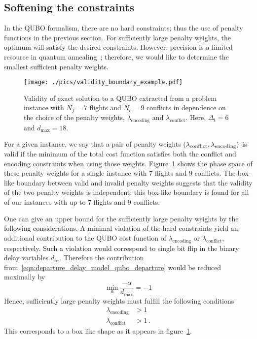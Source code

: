 \subsection{Softening the constraints}
In the QUBO formalism, there are no hard constraints; thus the use of penalty functions in the previous section.
For sufficiently large penalty weights, the optimum will satisfy the desired constraints.
However, precision is a limited resource in quantum annealing~\cite{TODO:D-Wave-precision}; therefore, we would like to determine the smallest sufficient penalty weights.

\begin{figure}[htpb]
\centering
\texttt{[image: ./pics/validity\_boundary\_example.pdf]}
\caption[Penalty weight phase diagram]{Validity of exact solution to a QUBO extracted from a problem instance with $N_f=7$ flights and $N_c=9$ conflicts in dependence on the choice of the penalty weights, $\lambda_\text{encoding}$ and $\lambda_\text{conflict}$. Here, $\Delta_t=6$ and $d_\text{max}=18$.}
\label{fig:penalty_weights}
\end{figure}

For a given instance, we say that a pair of penalty weights $(\lambda_{\mathrm{conflict}}, \lambda_{\mathrm{encoding}})$ is valid if the minimum of the total cost function satisfies both the conflict and encoding constraints when using those weights.
Figure~\ref{fig:penalty_weights} shows the phase space of these penalty weights for a single instance with $7$ flights and $9$ conflicts.
The box-like boundary between valid and invalid penalty weights suggests that the validity of the two penalty weights is independent; 
this box-like boundary is found for all of our instances with up to $7$ flights and $9$ conflicts.

One can give an upper bound for the sufficiently large penalty weights by the following considerations.
A minimal violation of the hard constraints yield an additional contribution to the QUBO cost function of $\lambda_\text{encoding}$ or $\lambda_\text{conflict}$, respectively.
Such a violation would correspond to single bit flip in the binary delay variables $d_{i\alpha}$.
Therefore the contribution from~\eqref{eqn:departure_delay_model_qubo_departure} would be reduced maximally by 
\begin{equation*}
    \min_\alpha \frac{-\alpha}{d_\text{max}} = - 1    
\end{equation*}
Hence, sufficiently large penalty weights must fulfill the following conditions
\begin{align*}
    \lambda_\text{encoding} & > 1 \\
    \lambda_\text{conflict} &> 1 \, .
\end{align*}
This corresponds to a box like shape as it appears in figure~\ref{fig:penalty_weights}.
